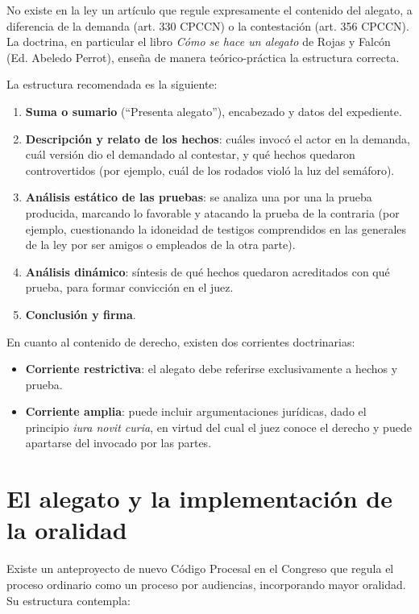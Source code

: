 \documentclass[12pt,oneside]{book}
\begin{document}
No existe en la ley un artículo que regule expresamente el contenido del alegato, a diferencia de la demanda (art. 330 CPCCN) o la contestación (art. 356 CPCCN). La doctrina, en particular el libro \textit{Cómo se hace un alegato} de Rojas y Falcón (Ed. Abeledo Perrot), enseña de manera teórico-práctica la estructura correcta.

La estructura recomendada es la siguiente:

\begin{enumerate}
    \item \textbf{Suma o sumario} (``Presenta alegato''), encabezado y datos del expediente.
    \item \textbf{Descripción y relato de los hechos}: cuáles invocó el actor en la demanda, cuál versión dio el demandado al contestar, y qué hechos quedaron controvertidos (por ejemplo, cuál de los rodados violó la luz del semáforo).
    \item \textbf{Análisis estático de las pruebas}: se analiza una por una la prueba producida, marcando lo favorable y atacando la prueba de la contraria (por ejemplo, cuestionando la idoneidad de testigos comprendidos en las generales de la ley por ser amigos o empleados de la otra parte).
    \item \textbf{Análisis dinámico}: síntesis de qué hechos quedaron acreditados con qué prueba, para formar convicción en el juez.
    \item \textbf{Conclusión y firma}.
\end{enumerate}

En cuanto al contenido de derecho, existen dos corrientes doctrinarias:
\begin{itemize}
    \item \textbf{Corriente restrictiva}: el alegato debe referirse exclusivamente a hechos y prueba.
    \item \textbf{Corriente amplia}: puede incluir argumentaciones jurídicas, dado el principio \textit{iura novit curia}, en virtud del cual el juez conoce el derecho y puede apartarse del invocado por las partes.
\end{itemize}

\section{El alegato y la implementación de la oralidad}

Existe un anteproyecto de nuevo Código Procesal en el Congreso que regula el proceso ordinario como un proceso por audiencias, incorporando mayor oralidad. Su estructura contempla:
\end{document}
